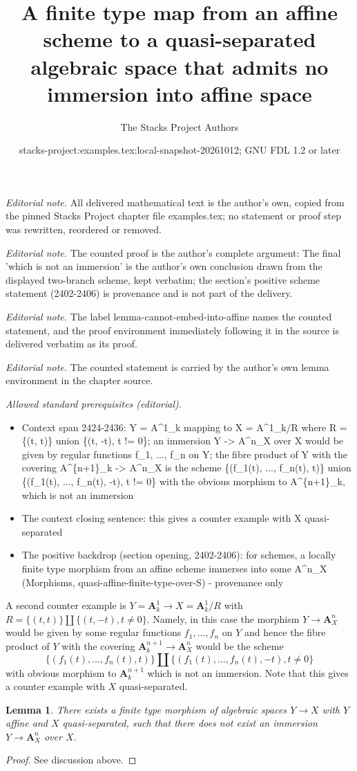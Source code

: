 \documentclass[10pt,a4paper]{amsart}
\title{A finite type map from an affine scheme to a quasi-separated algebraic space that admits no immersion into affine space}
\author{The Stacks Project Authors}
\date{stacks-project:examples.tex:local-snapshot-20261012; GNU FDL 1.2 or later}
\theoremstyle{plain}
\newtheorem{lemma}[subsection]{Lemma}
\theoremstyle{definition}
\theoremstyle{remark}
\numberwithin{equation}{subsection}
\begin{document}
\maketitle
\noindent\textit{Editorial note.} All delivered mathematical text is the author's own, copied from the pinned Stacks Project chapter file examples.tex; no statement or proof step was rewritten, reordered or removed.\par\medskip
\noindent\textit{Editorial note.} The counted proof is the author's complete argument: The final 'which is not an immersion' is the author's own conclusion drawn from the displayed two-branch scheme, kept verbatim; the section's positive scheme statement (2402-2406) is provenance and is not part of the delivery.\par\medskip
\noindent\textit{Editorial note.} The label lemma-cannot-embed-into-affine names the counted statement, and the proof environment immediately following it in the source is delivered verbatim as its proof.\par\medskip
\noindent\textit{Editorial note.} The counted statement is carried by the author's own lemma environment in the chapter source.\par\medskip
\noindent\textit{Allowed standard prerequisites (editorial).}\begin{itemize}
\item Context span 2424-2436: Y = A\textasciicircum{}1\_k mapping to X = A\textasciicircum{}1\_k/R where R = \{(t, t)\} union \{(t, -t), t != 0\}; an immersion Y -> A\textasciicircum{}n\_X over X would be given by regular functions f\_1, ..., f\_n on Y; the fibre product of Y with the covering A\textasciicircum{}\{n+1\}\_k -> A\textasciicircum{}n\_X is the scheme \{(f\_1(t), ..., f\_n(t), t)\} union \{(f\_1(t), ..., f\_n(t), -t), t != 0\} with the obvious morphism to A\textasciicircum{}\{n+1\}\_k, which is not an immersion
\item The context closing sentence: this gives a counter example with X quasi-separated
\item The positive backdrop (section opening, 2402-2406): for schemes, a locally finite type morphism from an affine scheme immerses into some A\textasciicircum{}n\_X (Morphisms, quasi-affine-finite-type-over-S) - provenance only
\end{itemize}\medskip
A second counter example is $Y = \mathbf{A}^1_k \to X = \mathbf{A}^1_k/R$
with $R = \{(t, t)\} \amalg \{(t, -t), t \not = 0\}$. Namely, in
this case the morphism $Y \to \mathbf{A}^n_X$ would be given by some
regular functions $f_1, \ldots, f_n$ on $Y$ and hence the
fibre product of $Y$ with the covering
$\mathbf{A}^{n + 1}_k \to \mathbf{A}^n_X$
would be the scheme
$$
\{(f_1(t), \ldots, f_n(t), t)\} \amalg
\{(f_1(t), \ldots, f_n(t), -t), t \not = 0\}
$$
with obvious morphism to $\mathbf{A}^{n + 1}_k$ which is not an immersion.
Note that this gives a counter example with $X$ quasi-separated.

\begin{lemma}
\label{lemma-cannot-embed-into-affine}
There exists a finite type morphism of algebraic spaces $Y \to X$
with $Y$ affine and $X$ quasi-separated, such that there does not exist
an immersion $Y \to \mathbf{A}^n_X$ over $X$.
\end{lemma}

\begin{proof}
See discussion above.
\end{proof}
\end{document}
